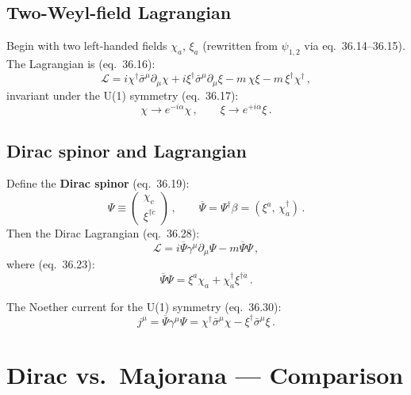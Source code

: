 \documentclass[12pt]{article}
\begin{document}
\subsection{Two-Weyl-field Lagrangian}

Begin with two left-handed fields $\chi_a$, $\xi_a$ (rewritten from $\psi_{1,2}$
via eq.~36.14--36.15). The Lagrangian is (eq.~36.16):
\begin{equation}
  \mathcal{L}
  = i\chi^\dagger\bar{\sigma}^\mu\partial_\mu\chi
  + i\xi^\dagger\bar{\sigma}^\mu\partial_\mu\xi
  - m\,\chi\xi - m\,\xi^\dagger\chi^\dagger\,,
  \tag{36.16}
\end{equation}
invariant under the U(1) symmetry (eq.~36.17):
\begin{equation}
  \chi \to e^{-i\alpha}\chi\,, \qquad \xi \to e^{+i\alpha}\xi\,.
  \tag{36.17}
\end{equation}

\subsection{Dirac spinor and Lagrangian}

Define the \textbf{Dirac spinor} (eq.~36.19):
\begin{equation}
  \Psi \equiv \begin{pmatrix}\chi_c\\\xi^{\dagger\dot{c}}\end{pmatrix}\,,
  \qquad
  \overline{\Psi} = \Psi^\dagger\beta = (\xi^a,\,\chi^\dagger_{\dot{a}})\,.
  \tag{36.19, 36.22}
\end{equation}
Then the Dirac Lagrangian (eq.~36.28):
\begin{equation}
  \boxed{\mathcal{L} = i\overline{\Psi}\gamma^\mu\partial_\mu\Psi - m\overline{\Psi}\Psi\,,}
  \tag{36.28}
\end{equation}
where (eq.~36.23):
\begin{equation}
  \overline{\Psi}\Psi = \xi^a\chi_a + \chi^\dagger_{\dot{a}}\xi^{\dagger\dot{a}}\,.
  \tag{36.23}
\end{equation}

The Noether current for the U(1) symmetry (eq.~36.30):
\begin{equation}
  j^\mu = \overline{\Psi}\gamma^\mu\Psi
        = \chi^\dagger\bar{\sigma}^\mu\chi - \xi^\dagger\bar{\sigma}^\mu\xi\,.
  \tag{36.30}
\end{equation}

\section{Dirac vs.\ Majorana --- Comparison}
\end{document}
